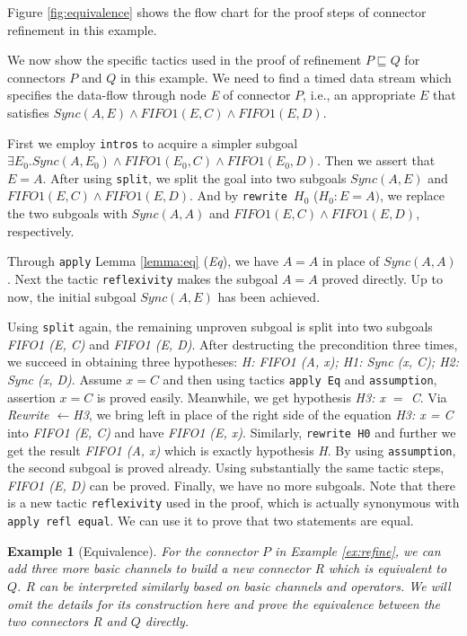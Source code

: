 \documentclass[preprint,3p]{elsarticle}
\newtheorem{example}{Example}[section]
\begin{document}
Figure \ref{fig:equivalence} shows the flow chart for the proof steps of
connector refinement in this example.


We now show the specific tactics used in the proof of refinement
$P \sqsubseteq Q$ for connectors $P$ and $Q$
in this example.
We need to find a timed data stream which specifies the data-flow through node \emph{E} of connector $P$, i.e., an appropriate \emph{$E$} that satisfies $Sync(A,E)\wedge FIFO1(E,C) \wedge FIFO1(E,D)$.

First we employ \texttt{intros} to acquire a simpler subgoal $\exists E_{0}. Sync(A,E_{0})
\wedge FIFO1(E_{0},C) \wedge FIFO1(E_{0},D)$. Then we assert that $E=A$.
After using \texttt{split}, we split the goal into two subgoals $Sync (A, E)$ and $FIFO1 (E, C) \wedge FIFO1 (E, D)$. And by \texttt{rewrite $H_{0}$} ($H_{0}: E = A)$, we replace the two subgoals with $Sync (A, A)$ and $FIFO1 (E, C) \wedge FIFO1 (E, D)$, respectively.

Through \texttt{apply} Lemma \ref{lemma:eq} (\emph{Eq}), we have $A = A$ in place of $Sync (A, A)$. Next the tactic \texttt{reflexivity} makes the subgoal $A = A$ proved directly. Up to now, the initial subgoal $Sync (A, E)$ has been achieved.

Using \texttt{split} again, the remaining unproven subgoal is split into two subgoals \emph{FIFO1 (E, C)} and \emph {FIFO1 (E, D)}.
After destructing the precondition three times, we succeed in obtaining three hypotheses: \emph{ H: FIFO1 (A, x); H1: Sync (x, C); H2: Sync (x, D)}. Assume $x = C$ and then using tactics \texttt{apply Eq} and \texttt{assumption}, assertion $x = C$ is proved easily. Meanwhile, we get hypothesis \emph{H3: x $=$ C}. Via \emph{Rewrite $\leftarrow$H3}, we bring left in place of the right side of the equation \emph{H3: x = C} into \emph{FIFO1 (E, C)} and have \emph{FIFO1 (E, x)}. Similarly, \texttt{rewrite H0} and further we get the result \emph{FIFO1 (A, x)} which is exactly hypothesis \emph{H}. By using \texttt{assumption}, the second subgoal is proved already.
Using substantially the same tactic steps, \emph{FIFO1 (E, D)} can be proved. Finally, we have no more subgoals. Note that there is a new tactic \texttt{reflexivity} used in the proof, which is actually synonymous with \texttt{apply refl equal}. We can use it to prove that two statements are equal.



\begin{example}[Equivalence]
For the connector $P$ in Example \ref{ex:refine}, we can add three more basic channels to build a new connector \emph{R} which is equivalent to $Q$. \emph{R} can be interpreted similarly based on basic channels and operators. We will omit the details for its construction here and prove the equivalence between the two connectors \emph{R} and $Q$ directly.
\end{example}
\end{document}
